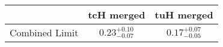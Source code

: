 \centering
\begin{tabular}{|c|c|c|} \hline
 & tcH merged & tuH merged\\\hline
Combined Limit & $0.23^{+0.10}_{-0.07}$ & $0.17^{+0.07}_{-0.05}$\\\hline
\end{tabular}
